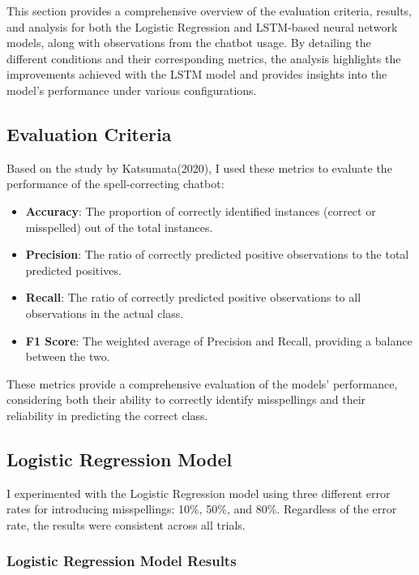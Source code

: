 This section provides a comprehensive overview of the evaluation criteria, results, and analysis for both the Logistic Regression and LSTM-based neural network models, along with observations from the chatbot usage. By detailing the different conditions and their corresponding metrics, the analysis highlights the improvements achieved with the LSTM model and provides insights into the model's performance under various configurations.

\subsection{Evaluation Criteria}
Based on the study by Katsumata(2020)\cite{Katsumata}, I used these metrics to evaluate the performance of the spell-correcting chatbot:
\begin{itemize}
    \item \textbf{Accuracy}: The proportion of correctly identified instances (correct or misspelled) out of the total instances.
    \item \textbf{Precision}: The ratio of correctly predicted positive observations to the total predicted positives.
    \item \textbf{Recall}: The ratio of correctly predicted positive observations to all observations in the actual class.
    \item \textbf{F1 Score}: The weighted average of Precision and Recall, providing a balance between the two.
\end{itemize}

These metrics provide a comprehensive evaluation of the models' performance, considering both their ability to correctly identify misspellings and their reliability in predicting the correct class.

\subsection{Logistic Regression Model}

I experimented with the Logistic Regression model using three different error rates for introducing misspellings: 10\%, 50\%, and 80\%. Regardless of the error rate, the results were consistent across all trials.

\subsubsection{Logistic Regression Model Results}

